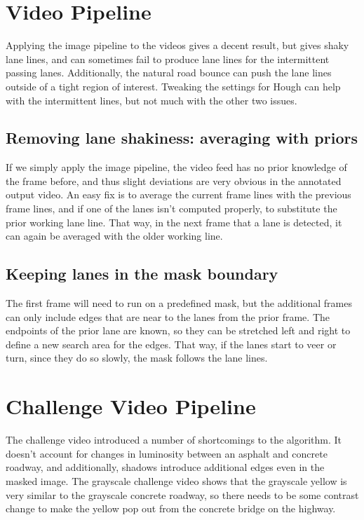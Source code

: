 \documentclass{article}
\begin{document}

\section{Video Pipeline}

Applying the image pipeline to the videos gives a decent result, but gives shaky lane lines, and can sometimes fail to produce lane lines for the intermittent passing lanes. Additionally, the natural road bounce can push the lane lines outside of a tight region of interest. Tweaking the settings for Hough can help with the intermittent lines, but not much with the other two issues.

\subsection{Removing lane shakiness: averaging with priors}

If we simply apply the image pipeline, the video feed has no prior knowledge of the frame before, and thus slight deviations are very obvious in the annotated output video. An easy fix is to average the current frame lines with the previous frame lines, and if one of the lanes isn't computed properly, to substitute the prior working lane line. That way, in the next frame that a lane is detected, it can again be averaged with the older working line.

\subsection{Keeping lanes in the mask boundary}

The first frame will need to run on a predefined mask, but the additional frames can only include edges that are near to the lanes from the prior frame. The endpoints of the prior lane are known, so they can be stretched left and right to define a new search area for the edges. That way, if the lanes start to veer or turn, since they do so slowly, the mask follows the lane lines.



\section{Challenge Video Pipeline}

The challenge video introduced a number of shortcomings to the algorithm. It doesn't account for changes in luminosity between an asphalt and concrete roadway, and additionally, shadows introduce additional edges even in the masked image. The grayscale challenge video shows that the grayscale yellow is very similar to the grayscale concrete roadway, so there needs to be some contrast change to make the yellow pop out from the concrete bridge on the highway.
\end{document}
